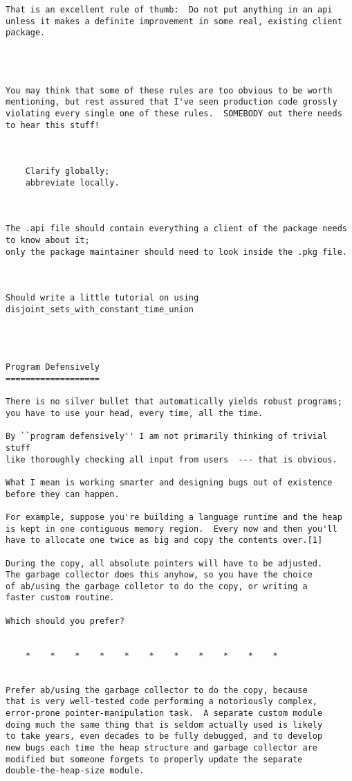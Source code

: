 \begin{verbatim}
That is an excellent rule of thumb:  Do not put anything in an api 
unless it makes a definite improvement in some real, existing client 
package. 




You may think that some of these rules are too obvious to be worth 
mentioning, but rest assured that I've seen production code grossly 
violating every single one of these rules.  SOMEBODY out there needs 
to hear this stuff! 



    Clarify globally; 
    abbreviate locally. 



The .api file should contain everything a client of the package needs to know about it; 
only the package maintainer should need to look inside the .pkg file. 



Should write a little tutorial on using disjoint_sets_with_constant_time_union 




Program Defensively 
=================== 

There is no silver bullet that automatically yields robust programs; 
you have to use your head, every time, all the time. 

By ``program defensively'' I am not primarily thinking of trivial stuff 
like thoroughly checking all input from users  --- that is obvious. 

What I mean is working smarter and designing bugs out of existence 
before they can happen. 

For example, suppose you're building a language runtime and the heap 
is kept in one contiguous memory region.  Every now and then you'll 
have to allocate one twice as big and copy the contents over.[1] 

During the copy, all absolute pointers will have to be adjusted. 
The garbage collector does this anyhow, so you have the choice 
of ab/using the garbage colletor to do the copy, or writing a 
faster custom routine. 

Which should you prefer? 


    *    *    *    *    *    *    *    *    *    *    * 


Prefer ab/using the garbage collector to do the copy, because 
that is very well-tested code performing a notoriously complex, 
error-prone pointer-manipulation task.  A separate custom module 
doing much the same thing that is seldom actually used is likely 
to take years, even decades to be fully debugged, and to develop 
new bugs each time the heap structure and garbage collector are 
modified but someone forgets to properly update the separate 
double-the-heap-size module. 


\end{verbatim}
